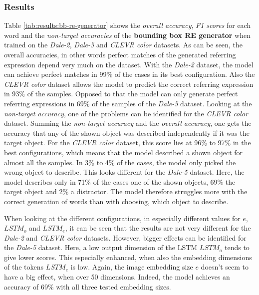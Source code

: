 \subsubsection*{Results}
Table \ref{tab:results:bb-re-generator} shows the \emph{overall accuracy}, \emph{F1 scores} for each word and the \emph{non-target accuracies} of the \textbf{bounding box RE generator} when trained on the \emph{Dale-2}, \emph{Dale-5} and \emph{CLEVR color} datasets.
As can be seen, the overall accuracies, in other words perfect matches of the generated referring expression depend very much on the dataset.
With the \emph{Dale-2} dataset, the model can achieve perfect matches in 99\% of the cases in its best configuration.
Also the \emph{CLEVR color} dataset allows the model to predict the correct referring expression in 93\% of the samples.
Opposed to that the model can only generate perfect referring expressions in 69\% of the samples of the \emph{Dale-5} dataset.
Looking at the \emph{non-target accuracy}, one of the problems can be identified for the \emph{CLEVR color} dataset.
Summing the \emph{non-target accuracy} and the \emph{overall accuracy}, one gets the accuracy that any of the shown object was described independently if it was the target object.
For the \emph{CLEVR color} dataset, this score lies at 96\% to 97\% in the best configurations, which means that the model described a shown object for almost all the samples.
In 3\% to 4\% of the cases, the model only picked the wrong object to describe.
This looks different for the \emph{Dale-5} dataset.
Here, the model describes only in 71\% of the cases one of the shown objects, 69\% the target object and 2\% a distractor.
The model therefore struggles more with the correct generation of words than with choosing, which object to describe.

When looking at the different configurations, in especially different values for $e$, $LSTM_o$ and $LSTM_e$, it can be seen that the results are not very different for the \emph{Dale-2} and \emph{CLEVR color} datasets.
However, bigger effects can be identified for the \emph{Dale-5} dataset.
Here, a low output dimension of the LSTM $LSTM_o$ tends to give lower scores.
This especially enhanced, when also the embedding dimensions of the tokens $LSTM_e$ is low.
Again, the image embedding size $e$ doesn't seem to have a big effect, when over 50 dimensions.
Indeed, the model achieves an accuracy of 69\% with all three tested embedding sizes.

